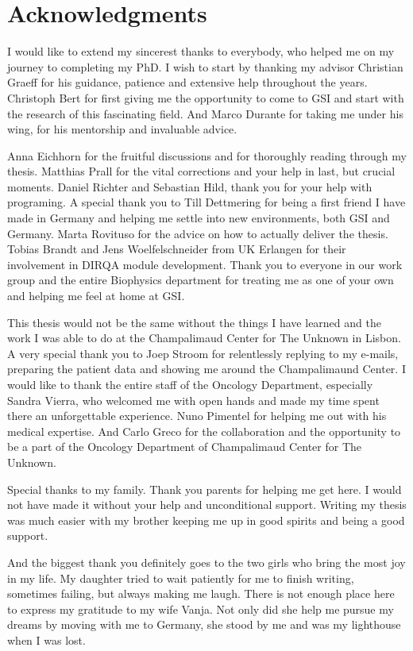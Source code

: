 

\chapter*{Acknowledgments}

I would like to extend my sincerest thanks to everybody, who helped me on my journey to completing my PhD.
I wish to start by thanking my advisor Christian Graeff for his guidance, patience and extensive help throughout the years. 
Christoph Bert for first giving me the opportunity to come to GSI and start with the research of this fascinating field. And Marco Durante for taking me under his wing, for his mentorship and invaluable advice.  

Anna Eichhorn for the fruitful discussions and for thoroughly reading through my thesis. Matthias Prall for the vital corrections and your help in last, but crucial moments. Daniel Richter and Sebastian Hild, thank you for your help with programing.
A special thank you to Till Dettmering for being a first friend I have made in Germany and helping me settle into new environments, both GSI and Germany. 
Marta Rovituso for the advice on how to actually deliver the thesis. Tobias Brandt and Jens Woelfelschneider from UK Erlangen for their involvement in DIRQA module development.
Thank you to everyone in our work group and the entire Biophysics department for treating me as one of your own and helping me feel at home at GSI. 

This thesis would not be the same without the things I have learned and the work I was able to do at the Champalimaud Center for The Unknown in Lisbon.
A very special thank you to Joep Stroom for relentlessly replying to my e-mails, preparing the patient data and showing me around the Champalimaund Center.
I would like to thank the entire staff of the Oncology Department, especially Sandra Vierra, who welcomed me with open hands and made my time spent there an unforgettable experience. 
Nuno Pimentel for helping me out with his medical expertise. And Carlo Greco for the collaboration and the opportunity to be a part of the Oncology Department of Champalimaud Center for The Unknown.

Special thanks to my family. Thank you parents for helping me get here. I would not have made it without your help and unconditional support. Writing my thesis was much easier with my brother keeping me up in good spirits
and being a good support.

And the biggest thank you definitely goes to the two girls who bring the most joy in my life. 
My daughter tried to wait patiently for me to finish writing, sometimes failing, but always making me laugh.
There is not enough place here to express my gratitude to my wife Vanja. Not only did she help me pursue my dreams by moving with me to Germany, she stood by me and was my lighthouse when I was lost.



